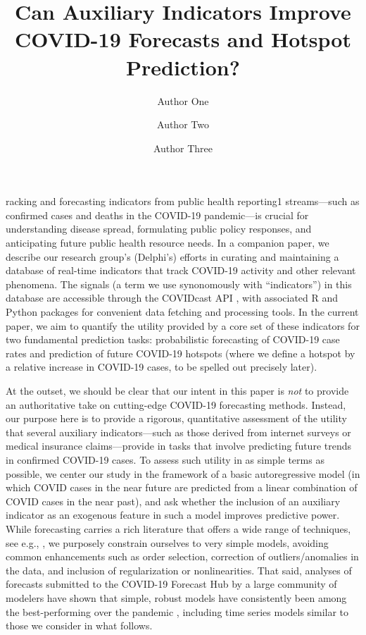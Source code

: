 \documentclass[9pt,twocolumn,twoside,lineno]{pnas-new}
\title{Can Auxiliary Indicators Improve COVID-19 Forecasts and Hotspot
  Prediction?}
\author[a,c,1]{Author One}
\author[b,1,2]{Author Two}
\author[a]{Author Three}
\affil[a]{Affiliation One}
\affil[b]{Affiliation Two}
\affil[c]{Affiliation Three}
\begin{document}
\maketitle
\thispagestyle{firststyle}

racking and forecasting indicators from public health reporting1
streams---such as confirmed cases and deaths in the COVID-19 pandemic---is
crucial for understanding disease spread, formulating public policy responses,
and anticipating future public health resource needs.  In a companion paper, we
describe our research group's (Delphi's) efforts in curating and maintaining a 
database of real-time indicators that track COVID-19 activity and other relevant
phenomena. The signals (a term we use synonomously with ``indicators'') in this
database are accessible through the COVIDcast API \cite{CovidcastAPI}, with
associated R \cite{CovidcastR} and Python \cite{CovidcastPy} packages for
convenient data fetching and processing tools. In the current paper, we aim to
quantify the utility provided by a core set of these indicators for two
fundamental prediction tasks: probabilistic forecasting of COVID-19 case 
rates and prediction of future COVID-19 hotspots (where we define a hotspot by a
relative increase in COVID-19 cases, to be spelled out precisely later). 

At the outset, we should be clear that our intent in this paper is \emph{not} to
provide an authoritative take on cutting-edge COVID-19 forecasting methods.
Instead, our purpose here is to provide a rigorous, quantitative assessment of
the utility that several auxiliary indicators---such as those derived from
internet surveys or medical insurance claims---provide in tasks that involve
predicting future trends in confirmed COVID-19 cases. To assess such utility in
as simple terms as possible, we center our study in the framework of a basic
autoregressive model (in which COVID cases in the near future are predicted from  
a linear combination of COVID cases in the near past), and ask whether the 
inclusion of an auxiliary indicator as an exogenous feature in such a model
improves predictive power. While forecasting carries a rich literature that
offers a wide range of techniques, see e.g., \cite{Hyndman:2018}, we purposely
constrain ourselves to very simple models, avoiding common enhancements such as
order selection, correction of outliers/anomalies in the data, and inclusion of
regularization or nonlinearities. That said, analyses of forecasts submitted to
the COVID-19 Forecast Hub \cite{ForecastHub} by a large community of modelers
have shown that simple, robust models have consistently been among the
best-performing over the pandemic \cite{Cramer:2021}, including time series
models similar to those we consider in what follows.  
\end{document}

